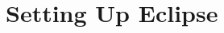 \newcommand{\prg}[1]{\textbf{#1}}
\newcommand{\loc}[1]{\textbf{\color{Aquamarine} #1}}
\newcommand{\inst}[1]{\textbf{\color{Purple} #1}}
\newcommand{\instloc}[1]{\textbf{\color{Green} #1}}
\newcommand{\pers}[1]{\textbf{\color{Orange} #1}}
\newcommand{\wind}[1]{\emph{\color{Orange} #1}}
\newcommand{\conf}[1]{\textbf{\color{Brown} #1}}
\newcommand{\confwind}[1]{\emph{\color{Brown} #1}}
\newcommand{\cmd}[1]{\-\ \hspace{20pt} \textbf{\color{YellowGreen} #1}}
\chapter{Setting Up Eclipse}
\label{ch:Eclipse}

